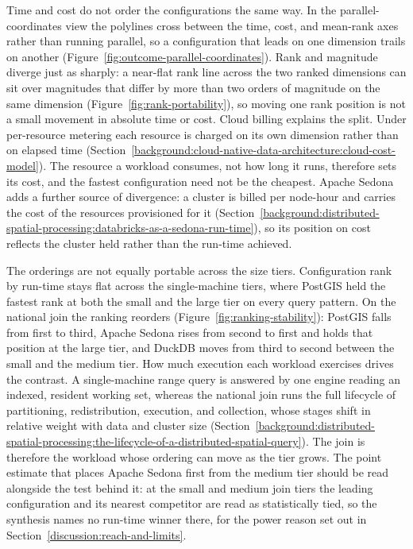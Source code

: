 Time and cost do not order the configurations the same way. In the parallel-coordinates view the polylines cross between the time, cost, and mean-rank axes rather than running parallel, so a configuration that leads on one dimension trails on another (Figure~\ref{fig:outcome-parallel-coordinates}). Rank and magnitude diverge just as sharply: a near-flat rank line across the two ranked dimensions can sit over magnitudes that differ by more than two orders of magnitude on the same dimension (Figure~\ref{fig:rank-portability}), so moving one rank position is not a small movement in absolute time or cost. Cloud billing explains the split. Under per-resource metering each resource is charged on its own dimension rather than on elapsed time \parencite{mell2011_nist_definition_of_cloud_computing} (Section~\ref{background:cloud-native-data-architecture:cloud-cost-model}). The resource a workload consumes, not how long it runs, therefore sets its cost, and the fastest configuration need not be the cheapest. Apache Sedona adds a further source of divergence: a cluster is billed per node-hour and carries the cost of the resources provisioned for it \parencite{databricks2024_cost_optimization_best_practices} (Section~\ref{background:distributed-spatial-processing:databricks-as-a-sedona-run-time}), so its position on cost reflects the cluster held rather than the run-time achieved.

The orderings are not equally portable across the size tiers. Configuration rank by run-time stays flat across the single-machine tiers, where PostGIS held the fastest rank at both the small and the large tier on every query pattern. On the national join the ranking reorders (Figure~\ref{fig:ranking-stability}): PostGIS falls from first to third, Apache Sedona rises from second to first and holds that position at the large tier, and DuckDB moves from third to second between the small and the medium tier. How much execution each workload exercises drives the contrast. A single-machine range query is answered by one engine reading an indexed, resident working set, whereas the national join runs the full lifecycle of partitioning, redistribution, execution, and collection, whose stages shift in relative weight with data and cluster size \parencite{yu2019_geospark_perspective_beyond} (Section~\ref{background:distributed-spatial-processing:the-lifecycle-of-a-distributed-spatial-query}). The join is therefore the workload whose ordering can move as the tier grows. The point estimate that places Apache Sedona first from the medium tier should be read alongside the test behind it: at the small and medium join tiers the leading configuration and its nearest competitor are read as statistically tied, so the synthesis names no run-time winner there, for the power reason set out in Section~\ref{discussion:reach-and-limits}.

